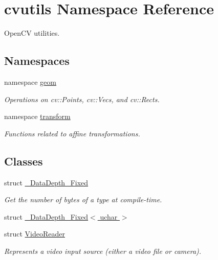 \hypertarget{namespacecvutils}{\section{cvutils Namespace Reference}
\label{namespacecvutils}
}


Open\-C\-V utilities.  


\subsection*{Namespaces}
\begin{DoxyCompactItemize}
\item 
namespace \hyperlink{namespacecvutils_1_1geom}{geom}
\begin{DoxyCompactList}\small\item\em Operations on {\ttfamily cv\-::\-Point}s, {\ttfamily cv\-::\-Vec}s, and {\ttfamily cv\-::\-Rect}s. \end{DoxyCompactList}\item 
namespace \hyperlink{namespacecvutils_1_1transform}{transform}
\begin{DoxyCompactList}\small\item\em Functions related to affine transformations. \end{DoxyCompactList}\end{DoxyCompactItemize}
\subsection*{Classes}
\begin{DoxyCompactItemize}
\item 
struct \hyperlink{structcvutils_1_1___data_depth___fixed}{\-\_\-\-Data\-Depth\-\_\-\-Fixed}
\begin{DoxyCompactList}\small\item\em Get the number of bytes of a type at compile-\/time. \end{DoxyCompactList}\item 
struct \hyperlink{structcvutils_1_1___data_depth___fixed_3_01uchar_01_4}{\-\_\-\-Data\-Depth\-\_\-\-Fixed$<$ uchar $>$}
\item 
struct \hyperlink{structcvutils_1_1_video_reader}{Video\-Reader}
\begin{DoxyCompactList}\small\item\em Represents a video input source (either a video file or camera). \end{DoxyCompactList}\end{DoxyCompactItemize}

